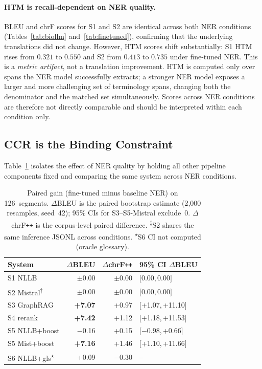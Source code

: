 \documentclass[11pt,a4paper,twocolumn]{article}
\begin{document}
\paragraph{HTM is recall-dependent on NER quality.}
BLEU and chrF scores for S1 and S2 are identical across both NER conditions
(Tables~\ref{tab:biollm} and~\ref{tab:finetuned}), confirming that the
underlying translations did not change. However, HTM scores shift substantially:
S1 HTM rises from $0.321$ to $0.550$ and S2 from $0.413$ to $0.735$ under
fine-tuned NER. This is a \emph{metric artifact}, not a translation improvement.
HTM is computed only over spans the NER model successfully extracts; a stronger
NER model exposes a larger and more challenging set of terminology spans,
changing both the denominator and the matched set simultaneously. Scores across
NER conditions are therefore not directly comparable and should be interpreted
within each condition only.

\subsection{CCR is the Binding Constraint}
\label{sec:ccr_bottleneck}

Table~\ref{tab:delta} isolates the effect of NER quality by holding all other
pipeline components fixed and comparing the same system across NER conditions.

\begin{table}[!ht]
\centering
\footnotesize
\setlength{\tabcolsep}{3pt}
\begin{tabular}{lrrl}
\toprule
System & $\Delta$BLEU & $\Delta$chrF\texttt{++} & 95\% CI $\Delta$BLEU \\
\midrule
S1 NLLB        & $\pm$0.00 & $\pm$0.00 & $[$0.00,\,0.00$]$ \\
S2 Mistral\textsuperscript{$\ddagger$} & $\pm$0.00 & $\pm$0.00 & $[$0.00,\,0.00$]$ \\
S3 GraphRAG    & \textbf{+7.07} & +0.97 & $[$+1.07,\,+11.10$]$ \\
S4 rerank      & \textbf{+7.42} & +1.12 & $[$+1.18,\,+11.53$]$ \\
S5 NLLB+boost  & $-$0.16 & +0.15 & $[$$-0.98$,\,+0.66$]$ \\
S5 Mist+boost  & \textbf{+7.16} & +1.46 & $[$+1.10,\,+11.66$]$ \\
S6 NLLB+gls\textsuperscript{$\star$}   & +0.09 & $-$0.30 & -- \\
\bottomrule
\end{tabular}
\caption{Paired gain (fine-tuned minus baseline NER) on 126~segments.
$\Delta$BLEU is the paired bootstrap estimate (2{,}000 resamples, seed~42);
95\% CIs for S3--S5-Mistral exclude~0.
$\Delta$chrF\texttt{++} is the corpus-level paired difference.
\textsuperscript{$\ddagger$}S2 shares the same inference JSONL across conditions.
\textsuperscript{$\star$}S6 CI not computed (oracle glossary).}
\label{tab:delta}
\end{table}
\end{document}
